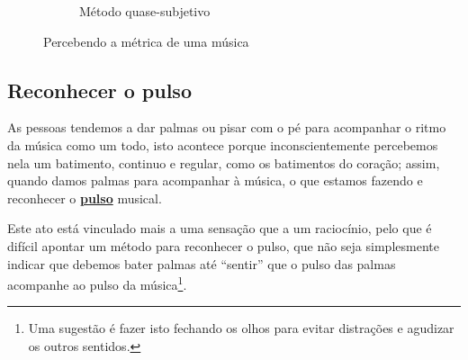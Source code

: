 \begin{figure}[h]
\begin{subfigure}[c]{0.45\textwidth}
\caption{Método quase-subjetivo}
\label{fig:fluxodancanopulso2}
\end{subfigure}
    \caption{Percebendo a métrica de uma música}\label{fig:fluxodancanopulso}
\end{figure}



\subsection{Reconhecer o pulso}
\label{subsec:perpulsomusica}
As pessoas tendemos a dar palmas ou pisar com o pé para acompanhar o ritmo da música como um todo,
isto acontece porque inconscientemente percebemos nela um batimento,
continuo e regular, como os batimentos do coração;
assim, quando damos palmas para acompanhar à música, o que estamos 
fazendo e reconhecer o  \hyperref[ref:Pulso]{\textbf{pulso}} musical. 

Este ato está vinculado mais a uma sensação que a um raciocínio,
pelo que é difícil apontar um método para reconhecer o pulso,
que não seja simplesmente indicar que debemos bater palmas até ``sentir''
que o pulso das palmas acompanhe ao pulso da música\footnote{Uma
sugestão é fazer isto fechando os olhos para evitar distrações e agudizar os outros sentidos. }.

